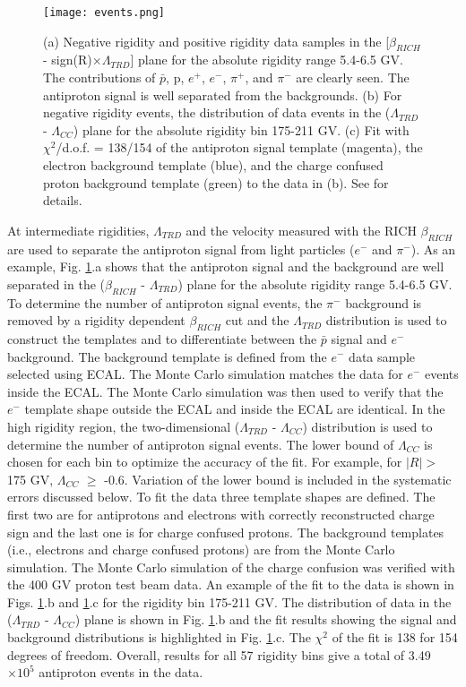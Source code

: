 \documentclass[twocolumn,twoside,slac_two]{revtex4-1}
\begin{document}
\begin{figure}[t]
\centering
\texttt{[image: events.png]}
\caption{(a) Negative rigidity and positive rigidity data samples
  in the [$\beta_{RICH}$ - sign(R)$\times \Lambda_{TRD}$] plane for the absolute rigidity
  range 5.4-6.5 GV. The contributions of $\bar{p}$, p, $e^+$, $e^-$, $\pi^+$, and $\pi^-$
  are clearly seen. The antiproton signal is well separated from the
  backgrounds. (b) For negative rigidity events, the distribution of
  data events in the ($\Lambda_{TRD}$ - $\Lambda_{CC}$) plane for the absolute rigidity bin
  175-211 GV. (c) Fit with $\chi^2$/d.o.f. = 138/154 of the antiproton
  signal template (magenta), the electron background template
  (blue), and the charge confused proton background template
(green) to the data in (b). See \cite{ref:AMS2_pbar} for details.} \label{events}
\end{figure}
At intermediate rigidities, $\Lambda_{TRD}$ and the velocity measured
with the RICH $\beta_{RICH}$ are used to separate the
antiproton signal from light particles ($e^-$ and $\pi^-$). As an
example, Fig. \ref{events}.a shows that the antiproton signal and the
background are well separated in the ($\beta_{RICH}$ - $\Lambda_{TRD}$) plane
for the absolute rigidity range 5.4-6.5 GV. To determine the
number of antiproton signal events, the $\pi^-$ background is
removed by a rigidity dependent $\beta_{RICH}$ cut and the $\Lambda_{TRD}$
distribution is used to construct the templates and to
differentiate between the $\bar{p}$ signal and $e^-$ background.
The background template is defined from the $e^-$ data
sample selected using ECAL. The Monte Carlo simulation
matches the data for $e^-$ events inside the ECAL. The
Monte Carlo simulation was then used to verify that the $e^-$
template shape outside the ECAL and inside the ECAL are
identical.
In the high rigidity region, the two-dimensional
($\Lambda_{TRD}$ - $\Lambda_{CC}$) distribution is used to determine the number
of antiproton signal events. The lower bound of $\Lambda_{CC}$ is
chosen for each bin to optimize the accuracy of the fit. For
example, for $\vert R \vert >$ 175 GV, $\Lambda_{CC}$ $\geq$ -0.6. Variation of the
lower bound is included in the systematic errors discussed
below. To fit the data three template shapes are defined. The
first two are for antiprotons and electrons with correctly
reconstructed charge sign and the last one is for charge
confused protons. The background templates (i.e., electrons
and charge confused protons) are from the
Monte Carlo simulation. The Monte Carlo simulation of
the charge confusion was verified with the 400 GV proton
test beam data. An example of the fit to the data is shown in
Figs. \ref{events}.b and \ref{events}.c for the rigidity bin 175-211 GV.
The distribution of data in the ($\Lambda_{TRD}$ - $\Lambda_{CC}$) plane is shown in
Fig. \ref{events}.b and the fit results showing the signal and background
distributions is highlighted in Fig. \ref{events}.c. The $\chi^2$ of
the fit is 138 for 154 degrees of freedom.
Overall, results for all 57 rigidity bins give a total of
3.49 $\times 10^5$ antiproton events in the data.
\end{document}
